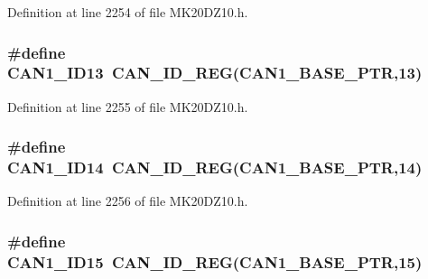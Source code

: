 Definition at line 2254 of file M\+K20\+D\+Z10.\+h.

\subsubsection[{\texorpdfstring{C\+A\+N1\+\_\+\+I\+D13}{CAN1_ID13}}]{\setlength{\rightskip}{0pt plus 5cm}\#define C\+A\+N1\+\_\+\+I\+D13~{\bf C\+A\+N\+\_\+\+I\+D\+\_\+\+R\+EG}({\bf C\+A\+N1\+\_\+\+B\+A\+S\+E\+\_\+\+P\+TR},13)}\hypertarget{group___c_a_n___register___accessor___macros_gaf60b8b33935278077935b3d26283c54b}{}\label{group___c_a_n___register___accessor___macros_gaf60b8b33935278077935b3d26283c54b}


Definition at line 2255 of file M\+K20\+D\+Z10.\+h.

\subsubsection[{\texorpdfstring{C\+A\+N1\+\_\+\+I\+D14}{CAN1_ID14}}]{\setlength{\rightskip}{0pt plus 5cm}\#define C\+A\+N1\+\_\+\+I\+D14~{\bf C\+A\+N\+\_\+\+I\+D\+\_\+\+R\+EG}({\bf C\+A\+N1\+\_\+\+B\+A\+S\+E\+\_\+\+P\+TR},14)}\hypertarget{group___c_a_n___register___accessor___macros_gabfcf44f9d5d1e771240703d29477e26b}{}\label{group___c_a_n___register___accessor___macros_gabfcf44f9d5d1e771240703d29477e26b}


Definition at line 2256 of file M\+K20\+D\+Z10.\+h.

\subsubsection[{\texorpdfstring{C\+A\+N1\+\_\+\+I\+D15}{CAN1_ID15}}]{\setlength{\rightskip}{0pt plus 5cm}\#define C\+A\+N1\+\_\+\+I\+D15~{\bf C\+A\+N\+\_\+\+I\+D\+\_\+\+R\+EG}({\bf C\+A\+N1\+\_\+\+B\+A\+S\+E\+\_\+\+P\+TR},15)}\hypertarget{group___c_a_n___register___accessor___macros_gae990d2bf65a44408311b036f6476e384}{}\label{group___c_a_n___register___accessor___macros_gae990d2bf65a44408311b036f6476e384}


